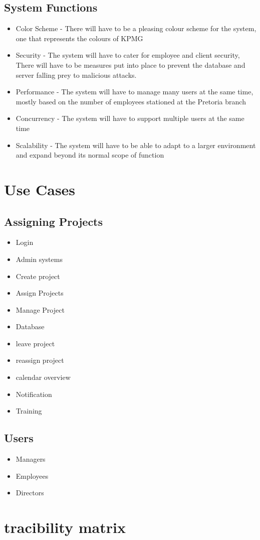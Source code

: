 \documentclass{article}
\begin{document}
	\subsection{System Functions}
		\begin{itemize}
			\item Color Scheme - There will have to be a pleasing colour scheme for           the system, one that represents the colours of KPMG
			\item Security - The system will have to cater for employee and client            security, There will have to be measures put into place to prevent         the database and server falling prey to malicious attacks. 
			\item Performance - The system will have to manage many users at the same         time, mostly based on the number of employees stationed at the            Pretoria branch
			\item Concurrency - The system will have to support multiple users at the         same time
			\item Scalability - The system will have to be able to adapt to a larger          environment and expand beyond its normal scope of function
		\end{itemize}
  
  \section{Use Cases}
  \begin{paragraph}
	\subsection{Assigning Projects}
		\begin{itemize}
			\item Login 
			\item Admin systems
			\item Create project
			\item Assign Projects
			\item Manage Project 
			\item Database
			\item leave project
			\item reassign project
			\item calendar overview
			\item Notification
			\item Training
		\end{itemize}
		
	\subsection{Users}
		\begin{itemize}
			\item Managers
			\item Employees
			\item Directors
		\end{itemize}
  \end{paragraph}
  
  \section{tracibility matrix}
  \begin{paragraph}
    
  \end{paragraph}
  
\end{document}
